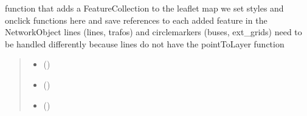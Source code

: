\documentclass[letterpaper,10pt,english]{sphinxmanual}
\begin{document}
\begin{fulllineitems}
\label{\detokenize{docs_gui/js_api/urbs_results/setup_urbs_results:addUrbsGeoJSONtoMap}}
\pysigstartsignatures
{}
\pysigstopsignatures
\sphinxAtStartPar
function that adds a FeatureCollection to the leaflet map
we set styles and onclick functions here and save references to each added feature in the NetworkObject
lines (lines, trafos) and circlemarkers (buses, ext\_grids) need to be handled differently because lines do not have the pointToLayer function
\begin{quote}\begin{description}
\begin{itemize}
\item {} 
\sphinxAtStartPar
{} () \textendash{} 

\item {} 
\sphinxAtStartPar
{} () \textendash{} 

\item {} 
\sphinxAtStartPar
{} () \textendash{} 

\end{itemize}

\end{description}\end{quote}

\end{fulllineitems}

\end{document}

